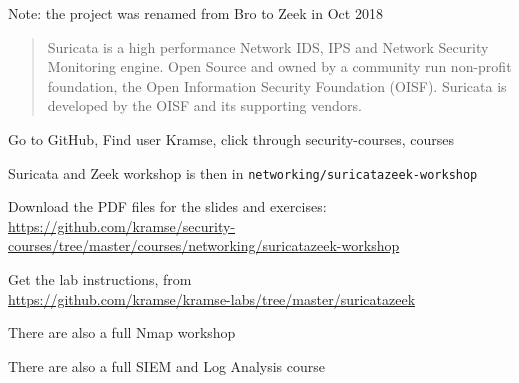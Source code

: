 \documentclass[Screen16to9,17pt]{foils}
\begin{document}
\centerline{Note: the project was renamed from Bro to Zeek in Oct 2018}




\begin{quote}
Suricata is a high performance Network IDS, IPS and Network Security Monitoring engine. Open Source and owned by a community run non-profit foundation, the Open Information Security Foundation (OISF). Suricata is developed by the OISF and its supporting vendors.
\end{quote}




\begin{list2}
\item Go to GitHub, Find user Kramse, click through security-courses, courses\\
\item Suricata and Zeek workshop is then in \verb+networking/suricatazeek-workshop+
\item Download the PDF files for the slides and exercises:\\  {\footnotesize \url{https://github.com/kramse/security-courses/tree/master/courses/networking/suricatazeek-workshop}}

\item Get the lab instructions, from\\ {\footnotesize\url{https://github.com/kramse/kramse-labs/tree/master/suricatazeek}}

\item There are also a full Nmap workshop\\
{\footnotesize{}}

\item There are also a full SIEM and Log Analysis course\\
{\footnotesize{}}


\end{list2}





\myquestionspage
\end{document}
